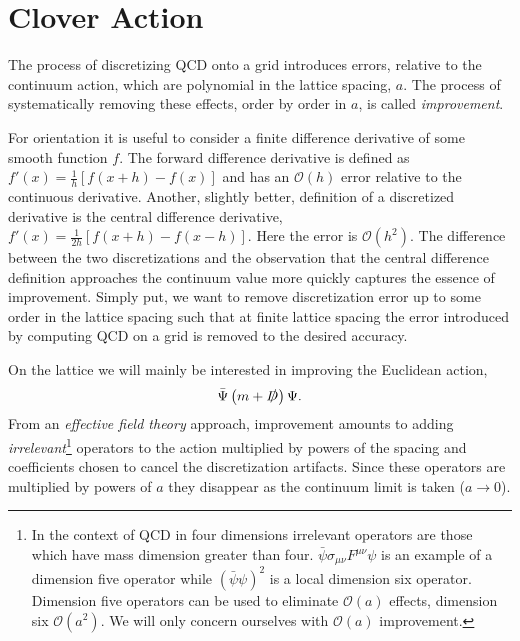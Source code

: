 \section{Clover Action} \label{app::Clover}
The process of discretizing QCD onto a grid introduces errors, relative to the continuum action, which are polynomial in the lattice spacing, $a$. The process of systematically removing these effects,  order by order in $a$, is called \emph{improvement}.

 For orientation it is useful to consider a finite difference derivative of some smooth function $f$. The forward difference derivative is defined as $f'(x) = \frac{1}{h}\left[f(x+h) - f(x)\right]$ and has an $\mathcal{O}(h)$ error relative to the continuous derivative. Another, slightly better, definition of a discretized derivative is the central difference derivative, $f'(x) = \frac{1}{2h}\left[ f(x+h) - f(x-h)\right]$. Here the error is $\mathcal{O}(h^2)$. The difference between the two discretizations and the observation that the central difference definition approaches the continuum value more quickly captures the essence of improvement. Simply put, we want to remove discretization error up to some order in the lattice spacing such that at finite lattice spacing the error introduced by computing QCD on a grid is removed to the desired accuracy. 

On the lattice we will mainly be interested in improving the Euclidean action, 
\begin{equation}
\bar{\Psi} \left( m + \slashed{D} \right) \Psi.
\end{equation}
From an \emph{effective field theory} approach, improvement amounts to adding \emph{irrelevant}\footnote{In the context of QCD in four dimensions irrelevant operators are those which have mass dimension greater than four. $\bar{\psi}\sigma_{\mu\nu}F^{\mu\nu} \psi$ is an example of a dimension five operator while $(\bar{\psi}\psi)^2$ is a local dimension six operator. Dimension five operators can be used to eliminate $\mathcal{O}(a)$ effects, dimension six $\mathcal{O}(a^2)$. We will only concern ourselves with $\mathcal{O}(a)$ improvement. } operators to the action multiplied by powers of the spacing and coefficients chosen to cancel the discretization artifacts. Since these operators are multiplied by powers of $a$ they disappear as the continuum limit is taken ($a\rightarrow0$). 

